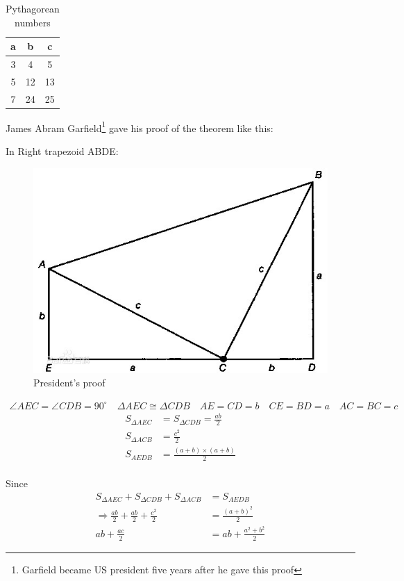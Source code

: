 \documentclass{article} %
\begin{document}
\begin{table}[H]
\centering
\setlength{\tabcolsep}{10mm}
\begin{tabular}{@{}ccc@{}}
\toprule
a & b  & c  \\ \midrule
3 & 4  & 5  \\
5 & 12 & 13 \\
7 & 24 & 25 \\ \bottomrule
\end{tabular}
\caption{Pythagorean numbers}
\label{tab:my-table}
\end{table}

James Abram Garfield\footnote{Garfield became US president five years after he gave this proof} gave his proof of the theorem like this:

In Right trapezoid ABDE:
\begin{figure}[H]
    \centering
    \includegraphics[scale = 0.3]{image/proof.jpg}
    \caption{President's proof}
    \label{pf}
\end{figure}
\begin{align*}
    \angle{AEC} = \angle{CDB} = 90^{\circ}\quad \Delta{AEC}\cong \Delta{CDB}\quad AE = CD = b\quad CE = BD = a\quad AC = BC = c
\end{align*}
\begin{align*}
    S_{\Delta AEC} &= S_{\Delta CDB} =\frac{ab}{2}\\
    S_{\Delta ACB} &= \frac{c^2}{2}\\
    S_{AEDB} &= \frac{(a+b)\times(a+b)}{2}\\
\end{align*}

Since
\begin{align*}
    S_{\Delta AEC} + S_{\Delta CDB}+S_{\Delta ACB} &= S_{AEDB}\\
    \Longrightarrow \frac{ab}{2}+\frac{ab}{2}+\frac{c^2}{2}&=\frac{(a+b)^2}{2}\\
    ab +\frac{ac}{2} &= ab + \frac{a^2+b^2}{2}
\end{align*}
\end{document}
